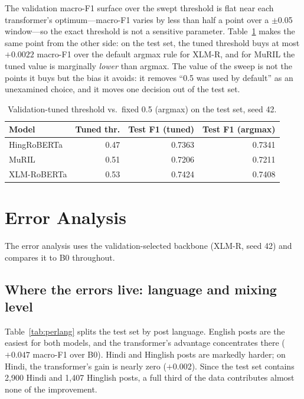 The validation macro-F1 surface over the swept threshold is flat near each
transformer's optimum---macro-F1 varies by less than half a point over a
$\pm$0.05 window---so the exact threshold is not a sensitive parameter. Table~\ref{tab:thresholds} makes the same point from the
other side: on the test set, the tuned threshold buys at most $+0.0022$ macro-F1
over the default argmax rule for XLM-R, and for MuRIL the tuned value is
marginally \emph{lower} than argmax. The value of the sweep is not the points it
buys but the bias it avoids: it removes ``0.5 was used by default'' as an
unexamined choice, and it moves one decision out of the test set.

\begin{table}[htbp]
\centering
\caption[Validation-tuned threshold vs.\ fixed 0.5 (seed 42)]{Validation-tuned threshold vs.\ fixed 0.5 (argmax) on the test set,
seed 42.}
\label{tab:thresholds}
\small
\begin{tabular}{lrrr}
\toprule
Model & Tuned thr. & Test F1 (tuned) & Test F1 (argmax) \\
\midrule
HingRoBERTa & 0.47 & 0.7363 & 0.7341 \\
MuRIL & 0.51 & 0.7206 & 0.7211 \\
XLM-RoBERTa & 0.53 & 0.7424 & 0.7408 \\
\bottomrule
\end{tabular}
\end{table}

\section{Error Analysis}
\label{sec:errors}

The error analysis uses the validation-selected backbone (XLM-R, seed 42) and
compares it to B0 throughout.

\subsection{Where the errors live: language and mixing level}
\label{sec:errors:lang}
Table~\ref{tab:perlang} splits the test set by post language. English posts are
the easiest for both models, and the transformer's advantage concentrates there
($+0.047$ macro-F1 over B0). Hindi and Hinglish posts are markedly harder; on
Hindi, the transformer's gain is nearly zero ($+0.002$). Since the test set
contains 2{,}900 Hindi and 1{,}407 Hinglish posts, a full third of the data
contributes almost none of the improvement.

